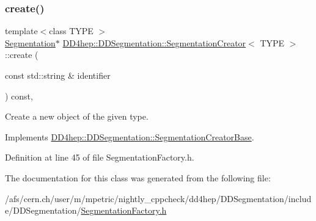 \subsubsection{\texorpdfstring{create()}{create()}}
{\footnotesize\ttfamily template$<$class T\+Y\+PE $>$ \\
\hyperlink{class_d_d4hep_1_1_d_d_segmentation_1_1_segmentation}{Segmentation}$\ast$ \hyperlink{class_d_d4hep_1_1_d_d_segmentation_1_1_segmentation_creator}{D\+D4hep\+::\+D\+D\+Segmentation\+::\+Segmentation\+Creator}$<$ T\+Y\+PE $>$\+::create (\begin{DoxyParamCaption}\item[{const std\+::string \&}]{identifier }\end{DoxyParamCaption}) const\hspace{0.3cm}{\ttfamily [inline]}, {\ttfamily [virtual]}}



Create a new object of the given type. 



Implements \hyperlink{class_d_d4hep_1_1_d_d_segmentation_1_1_segmentation_creator_base_aad60d04fe90588d97eeb8030f8d6daa3}{D\+D4hep\+::\+D\+D\+Segmentation\+::\+Segmentation\+Creator\+Base}.



Definition at line 45 of file Segmentation\+Factory.\+h.



The documentation for this class was generated from the following file\+:\begin{DoxyCompactItemize}
\item 
/afs/cern.\+ch/user/m/mpetric/nightly\+\_\+cppcheck/dd4hep/\+D\+D\+Segmentation/include/\+D\+D\+Segmentation/\hyperlink{_segmentation_factory_8h}{Segmentation\+Factory.\+h}\end{DoxyCompactItemize}
